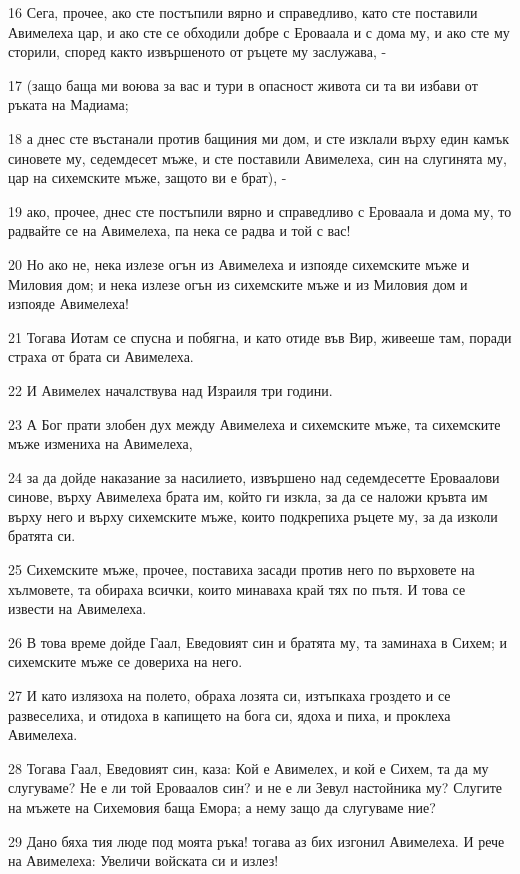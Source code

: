 \par 16 Сега, прочее, ако сте постъпили вярно и справедливо, като сте поставили Авимелеха цар, и ако сте се обходили добре с Ероваала и с дома му, и ако сте му сторили, според както извършеното от ръцете му заслужава, -
\par 17 (защо баща ми воюва за вас и тури в опасност живота си та ви избави от ръката на Мадиама;
\par 18 а днес сте въстанали против бащиния ми дом, и сте изклали върху един камък синовете му, седемдесет мъже, и сте поставили Авимелеха, син на слугинята му, цар на сихемските мъже, защото ви е брат), -
\par 19 ако, прочее, днес сте постъпили вярно и справедливо с Ероваала и дома му, то радвайте се на Авимелеха, па нека се радва и той с вас!
\par 20 Но ако не, нека излезе огън из Авимелеха и изпояде сихемските мъже и Миловия дом; и нека излезе огън из сихемските мъже и из Миловия дом и изпояде Авимелеха!
\par 21 Тогава Иотам се спусна и побягна, и като отиде във Вир, живееше там, поради страха от брата си Авимелеха.
\par 22 И Авимелех началствува над Израиля три години.
\par 23 А Бог прати злобен дух между Авимелеха и сихемските мъже, та сихемските мъже измениха на Авимелеха,
\par 24 за да дойде наказание за насилието, извършено над седемдесетте Ероваалови синове, върху Авимелеха брата им, който ги изкла, за да се наложи кръвта им върху него и върху сихемските мъже, които подкрепиха ръцете му, за да изколи братята си.
\par 25 Сихемските мъже, прочее, поставиха засади против него по върховете на хълмовете, та обираха всички, които минаваха край тях по пътя. И това се извести на Авимелеха.
\par 26 В това време дойде Гаал, Еведовият син и братята му, та заминаха в Сихем; и сихемските мъже се довериха на него.
\par 27 И като излязоха на полето, обраха лозята си, изтъпкаха гроздето и се развеселиха, и отидоха в капището на бога си, ядоха и пиха, и проклеха Авимелеха.
\par 28 Тогава Гаал, Еведовият син, каза: Кой е Авимелех, и кой е Сихем, та да му слугуваме? Не е ли той Ероваалов син? и не е ли Зевул настойника му? Слугите на мъжете на Сихемовия баща Емора; а нему защо да слугуваме ние?
\par 29 Дано бяха тия люде под моята ръка! тогава аз бих изгонил Авимелеха. И рече на Авимелеха: Увеличи войската си и излез!
